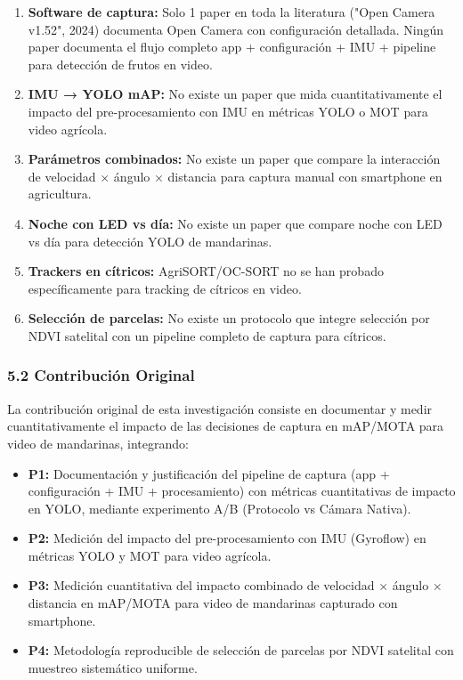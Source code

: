 \begin{enumerate}
\item \textbf{Software de captura:} Solo 1 paper en toda la literatura ("Open Camera v1.52", 2024) documenta Open Camera con configuración detallada. Ningún paper documenta el flujo completo app + configuración + IMU + pipeline para detección de frutos en video.
\item \textbf{IMU → YOLO mAP:} No existe un paper que mida cuantitativamente el impacto del pre-procesamiento con IMU en métricas YOLO o MOT para video agrícola.
\item \textbf{Parámetros combinados:} No existe un paper que compare la interacción de velocidad × ángulo × distancia para captura manual con smartphone en agricultura.
\item \textbf{Noche con LED vs día:} No existe un paper que compare noche con LED vs día para detección YOLO de mandarinas.
\item \textbf{Trackers en cítricos:} AgriSORT/OC-SORT no se han probado específicamente para tracking de cítricos en video.
\item \textbf{Selección de parcelas:} No existe un protocolo que integre selección por NDVI satelital con un pipeline completo de captura para cítricos.
\end{enumerate}

\subsubsection{5.2 Contribución Original}


La contribución original de esta investigación consiste en documentar y medir cuantitativamente el impacto de las decisiones de captura en mAP/MOTA para video de mandarinas, integrando:


\begin{itemize}
\item \textbf{P1:} Documentación y justificación del pipeline de captura (app + configuración + IMU + procesamiento) con métricas cuantitativas de impacto en YOLO, mediante experimento A/B (Protocolo vs Cámara Nativa).
\item \textbf{P2:} Medición del impacto del pre-procesamiento con IMU (Gyroflow) en métricas YOLO y MOT para video agrícola.
\item \textbf{P3:} Medición cuantitativa del impacto combinado de velocidad × ángulo × distancia en mAP/MOTA para video de mandarinas capturado con smartphone.
\item \textbf{P4:} Metodología reproducible de selección de parcelas por NDVI satelital con muestreo sistemático uniforme.
\end{itemize}

